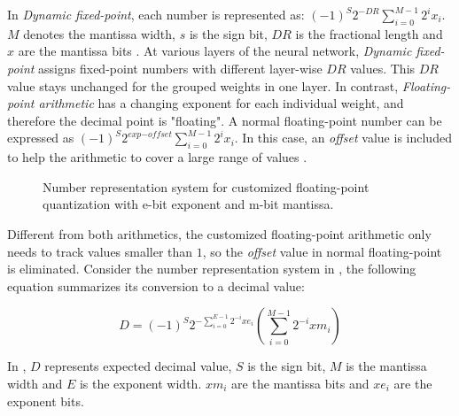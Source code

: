 \documentclass[a4paper,12pt]{report}
\begin{document}
In \textit{Dynamic fixed-point}, each number is represented as:
$(-1)^S2^{-\textit{DR}}\sum^{M-1}_{i=0}2^ix_i$.
$M$ denotes the mantissa width, $s$ is the sign bit, $\textit{DR}$ is the fractional length
and $x$ are the mantissa bits \cite{courbariaux2014training, Gysel}.
At various layers of the neural network, \textit{Dynamic fixed-point} assigns
fixed-point numbers with different layer-wise $\textit{DR}$ values.
This $\textit{DR}$ value stays unchanged for the grouped weights in one layer.
In contrast, \textit{Floating-point arithmetic} has a changing exponent for each
individual weight, and therefore the decimal point is "floating".
A normal floating-point number can be expressed as $(-1)^S2^{\textit{exp}-\textit{offset}}\sum^{M-1}_{i=0}2^ix_i$.
In this case, an \textit{offset} value is included to help the arithmetic to cover a large
range of values \cite{ercegovac2004digital}.
\begin{figure}[!h]
\centering
{}
\caption{Number representation system for customized floating-point quantization with
e-bit exponent and m-bit mantissa.}
\label{number_rep_dfp}
\end{figure}

Different from both arithmetics, the customized floating-point arithmetic only
needs to track values smaller than $1$, so the \textit{offset} value in normal floating-point
is eliminated.
Consider the number representation system in , the following
equation summarizes its conversion to a decimal value:

\begin{equation} \label{equ:d2dfp2}
    D = (-1)^S 2^{-\sum^{E-1}_{i=0}2^{-i}xe_i}(\sum^{M-1}_{i=0}2^{-i}xm_i)
\end{equation}

In , $D$ represents expected decimal value, $S$ is the sign
bit, $M$ is the mantissa width and $E$ is the exponent width.
$xm_i$ are the mantissa bits and $xe_i$ are the exponent bits.
\end{document}
